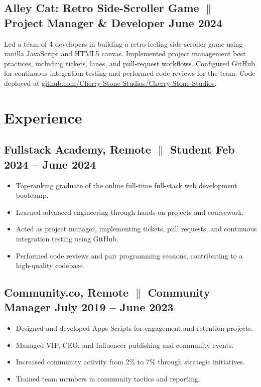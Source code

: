 \documentclass[a4paper,10pt]{article}
\begin{document}
\subsection{Alley Cat: Retro Side-Scroller Game {$\parallel$}{
                  Project Manager
                  \& Developer}
      \hfill \textbf{June 2024}
}
{Led a team of 4 developers in building a retro-feeling
      side-scroller game using vanilla JavaScript and HTML5 canvas.
      Implemented
      project management best practices, including tickets, lanes, and
      pull-request
      workflows. Configured GitHub for continuous integration testing and
      performed
      code reviews for the team. Code deployed at \href{https://github.com/Cherry-Stone-Studios/Cherry-Stone-Studios}{github.com/Cherry-Stone-Studios/Cherry-Stone-Studios}.}

\section{Experience}

\subsection{Fullstack Academy, Remote {$\parallel$}{ Student} \hfill
      \textbf{Feb
            2024 – June
            2024}}
\begin{itemize}
      \item Top-ranking graduate of the online full-time full-stack web
            development
            bootcamp.
      \item Learned advanced engineering through
            hands-on
            projects and coursework.
      \item Acted as project manager, implementing tickets, pull requests, and
            continuous integration testing using GitHub.
      \item Performed code reviews and pair programming sessions, contributing
            to a high-quality codebase.
\end{itemize}

\subsection{Community.co, Remote {$\parallel$}{ Community Manager} \hfill
      \textbf{July 2019 – June
            2023}}
\begin{itemize}
      \item Designed and developed Apps Scripts for engagement and retention
            projects.
      \item Managed VIP, CEO, and Influencer publishing and community
            events.
      \item Increased community activity from 2\% to 7\% through
            strategic
            initiatives.
      \item Trained team members in community tactics and reporting.
\end{itemize}
\end{document}
